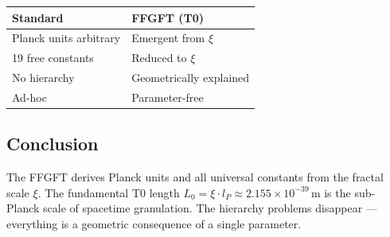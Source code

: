 	\begin{center}
		\begin{tabular}{p{}p{}}
			\textbf{Standard} & \textbf{FFGFT (T0)} \\
			\hline
			Planck units arbitrary & Emergent from \(\xi\) \\
			19 free constants & Reduced to \(\xi\) \\
			No hierarchy & Geometrically explained \\
			Ad-hoc & Parameter-free \\
		\end{tabular}
	\end{center}
	
	\subsection*{Conclusion}
	
	The FFGFT derives Planck units and all universal constants from the fractal scale \(\xi\). The fundamental T0 length \(L_0 = \xi \cdot l_P \approx 2.155 \times 10^{-39}\,\)m is the sub-Planck scale of spacetime granulation. The hierarchy problems disappear — everything is a geometric consequence of a single parameter.




